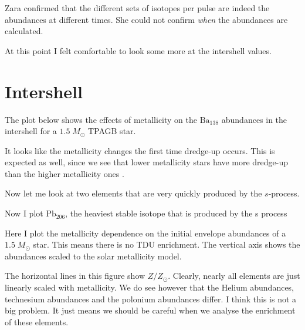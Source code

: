 \documentclass[a4paper,10pt]{article}
\begin{document}
Zara confirmed that the different sets of isotopes per pulse are indeed the abundances at different times.
She could not confirm \emph{when} the abundances are calculated.

At this point I felt comfortable to look some more at the intershell values.

\section{Intershell}

The plot below shows the effects of metallicity on the \(\text{Ba}_{138}\) abundances in the intershell for a \(1.5\;M_\odot \) TPAGB star.

\begin{figure}[ht]
    \centering
\end{figure}

It looks like the metallicity changes the first time dredge-up occurs. This is expected as well, since we see that lower metallicity stars have more dredge-up than the higher metallicity ones \citep{karakas2016}.

Now let me look at two elements that are very quickly produced by the \(s\)-process.
\begin{figure}[ht]
    \centering
\end{figure}

\begin{figure}[ht]
    \centering
\end{figure}

Now I plot \(\text{Pb}_{206}\), the heaviest stable isotope that is produced by the s process

\begin{figure}[ht]
    \centering
\end{figure}

Here I plot the metallicity dependence on the initial envelope abundances of a \(1.5\;M_\odot \) star. This means there is no TDU enrichment.
The vertical axis shows the abundances scaled to the solar metallicity model.

\nextpage
\begin{figure}[ht]
    \centering
\end{figure}

The horizontal lines in this figure show \(Z / Z_\odot \). Clearly, nearly all elements are just linearly scaled with metallicity. We do see however that the Helium abundances, technesium abundances and the polonium abundances differ. I think this is not a big problem. It just means we should be careful when we analyse the enrichment of these elements.
\end{document}
